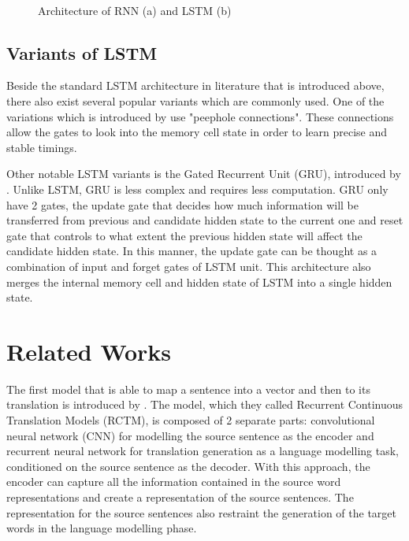 \documentclass[12pt]{extarticle}
\begin{document}
\begin{figure}[ht]
\centering
{} \\

\caption{Architecture of RNN (a) and LSTM (b)}
\label{fig:rnn}
\end{figure}

\subsection*{Variants of LSTM}
Beside the standard LSTM architecture in literature that is introduced above, there also exist several popular variants which are commonly used. One of the variations which is introduced by \citep{DBLP:conf/ijcnn/GersS00} use "peephole connections". These connections allow the gates to look into the memory cell state in order to learn precise and stable timings. 

Other notable LSTM variants is the Gated Recurrent Unit (GRU), introduced by \citep{cho-etal-2014-learning}. Unlike LSTM, GRU is less complex and requires less computation. GRU only have 2 gates, the update gate that decides how much information will be transferred from previous and candidate hidden state to the current one and reset gate that controls to what extent the previous hidden state will affect the candidate hidden state. In this manner, the update gate can be thought as a combination of input and forget gates of LSTM unit. This architecture also merges the internal memory cell and hidden state of LSTM into a single hidden state.

\section*{Related Works}
The first model that is able to map a sentence into a vector and then to its translation is introduced by \citep{kalchbrenner-blunsom-2013-recurrent-continuous}. The model, which they called Recurrent Continuous Translation Models (RCTM), is composed of 2 separate parts: convolutional neural network (CNN) for modelling the source sentence as the encoder and recurrent neural network for translation generation as a language modelling task, conditioned on the source sentence as the decoder. With this approach, the encoder can capture all the information contained in the source word representations and create a representation of the source sentences. The representation for the source sentences also restraint the generation of the target words in the language modelling phase.
\end{document}
